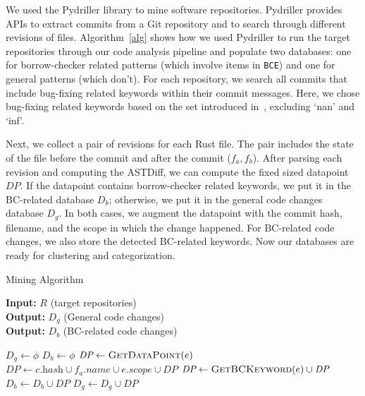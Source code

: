 We used the Pydriller library to mine software repositories. Pydriller provides APIs to extract commits from a Git repository and to search through different revisions of files. Algorithm~\ref{alg} shows how we used Pydriller to run the target repositories through our code analysis pipeline and populate two databases: one for borrow-checker related patterns (which involve items in \texttt{BCE}) and one for general patterns (which don't). For each repository, we search all commits that include bug-fixing related keywords within their commit messages. Here, we chose bug-fixing related keywords based on the set introduced in~\cite{zhang2018empirical}, excluding `nan' and `inf'. 


Next, we collect a pair of revisions for each Rust file. The pair includes the state of the file before the commit and after the commit ($f_a, f_b$). After parsing each revision and computing the ASTDiff, we can compute the fixed sized datapoint $\mathit{DP}$. If the datapoint contains borrow-checker related keywords, we put it in the BC-related database $D_b$; otherwise, we put it in the general code changes database $D_g$. In both cases, we augment the datapoint with the commit hash, filename, and the scope in which the change happened. For BC-related code changes, we also store the detected BC-related keywords. Now our databases are ready for clustering and categorization.

\begin{algorithm}
\caption{\label{alg} Mining Algorithm}
\hspace*{2mm} \textbf{Input:} $R$ (target repositories)  \\
\hspace*{2mm} \textbf{Output:} $D_g$ (General code changes) \\
\hspace*{2mm} \textbf{Output:} $D_b$ (BC-related code changes)
\begin{algorithmic}
\State $D_g \leftarrow \phi$
\State $D_b \leftarrow \phi$
                    \State $\textit{DP} \leftarrow \textsc{GetDataPoint}(e)$
                    \State $\textit{DP} \leftarrow c.\textit{hash} \cup f_a.\textit{name} \cup e.\textit{scope} \cup \textit{DP} $
                        \State $\textit{DP} \leftarrow \textsc{GetBCKeyword}(e) \cup \textit{DP} $
                        \State $D_b \leftarrow D_b \cup \textit{DP}$
                    \Else
                        \State $D_g \leftarrow D_g \cup \textit{DP}$
                    \EndIf
                \EndFor
            \EndFor
        \EndIf
    \EndFor
\EndFor
\end{algorithmic}
\end{algorithm}

